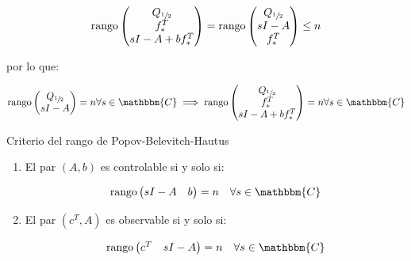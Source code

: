         \begin{equation}
            \operatorname{rango}{\begin{pmatrix} Q_{\sfrac{1}{2}} \\ f_*^T \\ sI - A + b f_*^T \end{pmatrix}} = \operatorname{rango}{\begin{pmatrix} Q_{\sfrac{1}{2}} \\ sI - A \\ f_*^T \end{pmatrix}} \le n
        \end{equation}

        por lo que:

        \begin{equation}
            \rango{\begin{pmatrix} Q_{\sfrac{1}{2}} \\ sI - A \end{pmatrix}} = n \forall s \in \mathbbm{C} \implies \rango{\begin{pmatrix} Q_{\sfrac{1}{2}} \\ f_*^T \\ sI - A + b f_*^T \end{pmatrix}} = n \forall s \in \mathbbm{C}
        \end{equation}

        \begin{nota}
            Criterio del rango de Popov-Belevitch-Hautus
            \begin{enumerate}[i]
                \item El par $(A, b)$ es controlable si y solo si:

                \begin{equation*}
                    \rango{\begin{pmatrix} sI - A & b \end{pmatrix}} = n \quad \forall s \in \mathbbm{C}
                \end{equation*}

                \item El par $(c^T, A)$ es observable si y solo si:

                \begin{equation*}
                    \rango{\begin{pmatrix} c^T & sI - A \end{pmatrix}} = n \quad \forall s \in \mathbbm{C}
                \end{equation*}
            \end{enumerate}
        \end{nota}

